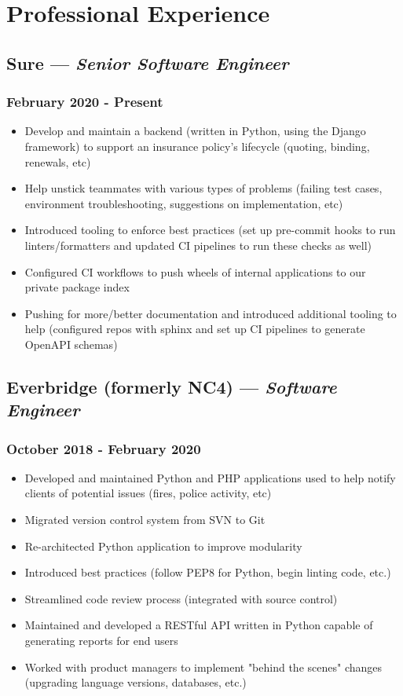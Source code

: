 \documentclass{article}
\begin{document}
\begin{minipage}[t]{.6\textwidth}
\section*{Professional Experience}
\subsection*{Sure  --- \textit{Senior Software Engineer}}
\subsubsection*{February 2020 - Present}
\begin{itemize}
    \item Develop and maintain a backend (written in Python, using the Django framework) to support an insurance policy's lifecycle (quoting, binding, renewals, etc)
    \item Help unstick teammates with various types of problems (failing test cases, environment troubleshooting, suggestions on implementation, etc)
    \item Introduced tooling to enforce best practices (set up pre-commit hooks to run linters/formatters and updated CI pipelines to run these checks as well)
    \item Configured CI workflows to push wheels of internal applications to our private package index
    \item Pushing for more/better documentation and introduced additional tooling to help (configured repos with sphinx and set up CI pipelines to generate OpenAPI schemas)
\end{itemize}
\subsection*{Everbridge (formerly NC4) --- \textit{Software Engineer}}
\subsubsection*{October 2018 - February 2020}
\begin{itemize}
    \item Developed and maintained Python and PHP applications used to help notify clients of potential issues (fires, police activity, etc)
    \item Migrated version control system from SVN to Git
    \item Re-architected Python application to improve modularity
    \item Introduced best practices (follow PEP8 for Python, begin linting code, etc.)
    \item Streamlined code review process (integrated with source control)
    \item Maintained and developed a RESTful API written in Python capable of generating reports for end users
    \item Worked with product managers to implement "behind the scenes" changes (upgrading language versions, databases, etc.)
\end{itemize}

\end{minipage}
\end{document}
